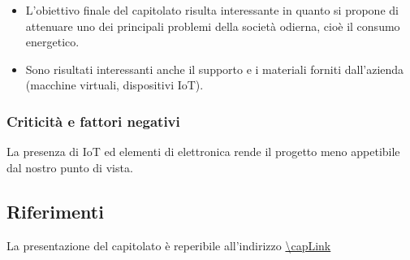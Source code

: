 \begin{itemize}
    \item L'obiettivo finale del capitolato risulta interessante in quanto si propone di attenuare uno dei principali problemi della società odierna, cioè il consumo energetico.
    \item Sono risultati interessanti anche il supporto e i materiali forniti dall'azienda (macchine virtuali, dispositivi IoT).
\end{itemize}

\subsubsection{Criticità e fattori negativi}
La presenza di IoT ed elementi di elettronica rende il progetto meno appetibile dal nostro punto di vista.

\subsection{Riferimenti}
La presentazione del capitolato è reperibile all'indirizzo \url{\capLink}
